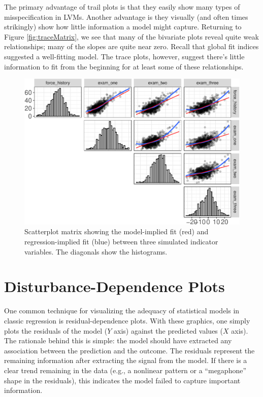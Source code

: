 \documentclass[
  english,
  doc]{apa6}
\begin{document}
The primary advantage of trail plots is that they easily show many types of misspecification in LVMs. Another advantage is they visually (and often times strikingly) show how little information a model might capture. Returning to Figure \ref{fig:traceMatrix}, we see that many of the bivariate plots reveal quite weak relationships; many of the slopes are quite near zero. Recall that global fit indices suggested a well-fitting model. The trace plots, however, suggest there's little information to fit from the beginning for at least some of these relationships.

\begin{figure}
\centering
\includegraphics{flexplavaan_draft_files/figure-latex/traceMatrix2-1.pdf}
\caption{\label{fig:traceMatrix2}Scatterplot matrix showing the model-implied fit (red) and regression-implied fit (blue) between three simulated indicator variables. The diagonals show the histograms.}
\end{figure}

\hypertarget{disturbance-dependence-plots}{%
\section{Disturbance-Dependence Plots}\label{disturbance-dependence-plots}}

One common technique for visualizing the adequacy of statistical models in classic regression is residual-dependence plots. With these graphics, one simply plots the residuals of the model (\(Y\) axis) against the predicted values (\(X\) axis). The rationale behind this is simple: the model should have extracted any association between the prediction and the outcome. The residuals represent the remaining information after extracting the signal from the model. If there is a clear trend remaining in the data (e.g., a nonlinear pattern or a ``megaphone'' shape in the residuals), this indicates the model failed to capture important information.
\end{document}

